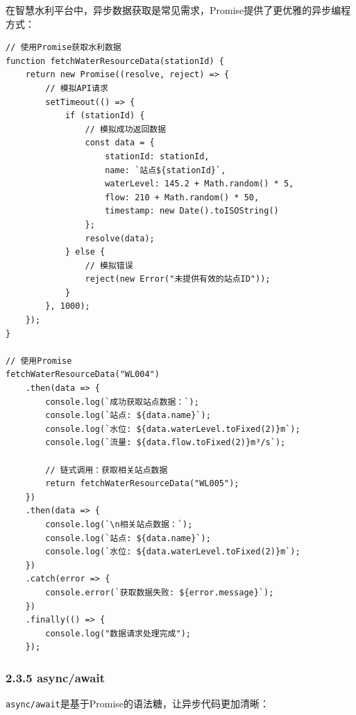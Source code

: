 在智慧水利平台中，异步数据获取是常见需求，Promise提供了更优雅的异步编程方式：

\begin{lstlisting}
// 使用Promise获取水利数据
function fetchWaterResourceData(stationId) {
    return new Promise((resolve, reject) => {
        // 模拟API请求
        setTimeout(() => {
            if (stationId) {
                // 模拟成功返回数据
                const data = {
                    stationId: stationId,
                    name: `站点${stationId}`,
                    waterLevel: 145.2 + Math.random() * 5,
                    flow: 210 + Math.random() * 50,
                    timestamp: new Date().toISOString()
                };
                resolve(data);
            } else {
                // 模拟错误
                reject(new Error("未提供有效的站点ID"));
            }
        }, 1000);
    });
}

// 使用Promise
fetchWaterResourceData("WL004")
    .then(data => {
        console.log(`成功获取站点数据：`);
        console.log(`站点: ${data.name}`);
        console.log(`水位: ${data.waterLevel.toFixed(2)}m`);
        console.log(`流量: ${data.flow.toFixed(2)}m³/s`);
        
        // 链式调用：获取相关站点数据
        return fetchWaterResourceData("WL005");
    })
    .then(data => {
        console.log(`\n相关站点数据：`);
        console.log(`站点: ${data.name}`);
        console.log(`水位: ${data.waterLevel.toFixed(2)}m`);
    })
    .catch(error => {
        console.error(`获取数据失败: ${error.message}`);
    })
    .finally(() => {
        console.log("数据请求处理完成");
    });
\end{lstlisting}

\subsubsection{2.3.5 async/await}\label{asyncawait}

\passthrough{\lstinline!async/await!}是基于Promise的语法糖，让异步代码更加清晰：

